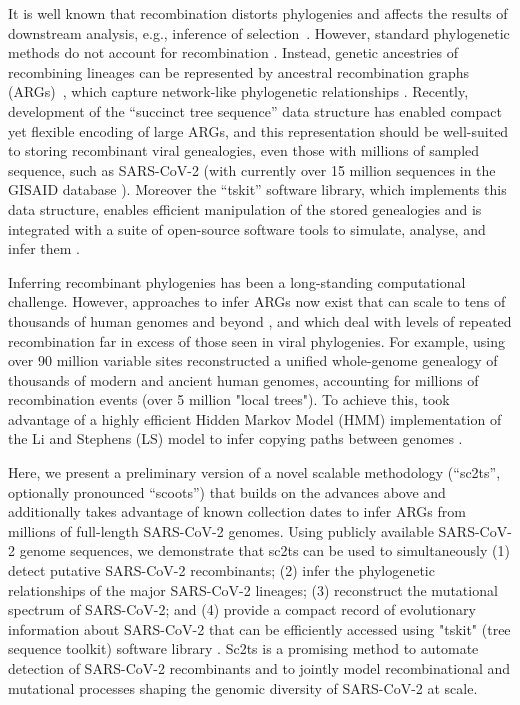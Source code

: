 \documentclass{article}
\begin{document}
It is well known that recombination distorts phylogenies \citep{Schierup2000-fg}
and affects the results of downstream analysis, e.g., inference of
selection~\citep{Anisimova2003-vr}. However, standard phylogenetic methods do
not account for recombination
\citep[e.g.][]{Ronquist2012-zw,Minh2020-lr,Guindon2003-zd}. Instead,
genetic ancestries of recombining lineages can be represented by ancestral
recombination graphs (ARGs)~\citep{Griffiths1981-lw,Hudson1983-if}, which
capture network-like phylogenetic relationships \citep{Gusfield2014-qw}. Recently,
development of the ``succinct tree sequence'' data
structure \citep{Kelleher2018-xc}  has enabled compact yet flexible
encoding of large ARGs, and this representation should be well-suited to storing
recombinant viral genealogies, even those with millions of sampled sequence,
such as SARS-CoV-2 (with currently over 15 million sequences in the GISAID database
\citep{Shu2017-hp}). Moreover the ``tskit'' software library, which implements this
data structure, enables efficient manipulation of the stored genealogies and is
integrated with a suite of open-source software tools to simulate, analyse, and
infer them \citep{Baumdicker2022-ep,Kelleher2018-xc,Kelleher2019-ba,Wohns2022-th}.


Inferring recombinant phylogenies has been a long-standing computational challenge.
However, approaches to infer ARGs now exist that can scale to tens of
thousands of human genomes and beyond
\citep{Speidel2019-yh,Kelleher2019-ba,Zhang2021-lf,Schaefer2021-yg}, and which
deal with levels of repeated recombination far in excess of those seen in viral
phylogenies. For example, using over 90 million variable sites
\citet{Wohns2022-th} reconstructed a unified whole-genome genealogy of thousands
of modern and ancient human genomes, accounting for millions of recombination
events (over 5 million "local trees"). To achieve this, \cite{Wohns2022-th}
took advantage of a highly efficient Hidden Markov Model (HMM) implementation
of the Li and Stephens (LS) model \citep{Li2003-ib} to infer copying paths between
genomes \citep{Kelleher2019-ba}.


Here, we present a preliminary version of a novel scalable methodology
(``sc2ts'', optionally pronounced ``scoots'') that builds on the advances above
and additionally takes advantage of known collection dates to infer ARGs from millions
of full-length SARS-CoV-2 genomes. Using publicly available SARS-CoV-2 genome sequences,
we demonstrate that sc2ts can be used to simultaneously (1) detect putative SARS-CoV-2
recombinants; (2) infer the phylogenetic relationships of the major SARS-CoV-2 lineages;
(3) reconstruct the mutational spectrum of SARS-CoV-2; and (4) provide a compact record
of evolutionary information about SARS-CoV-2 that can be efficiently accessed using
"tskit" (tree sequence toolkit) software library \citep{Kelleher2018-xc}.
Sc2ts is a promising method to automate detection of SARS-CoV-2 recombinants
and to jointly model recombinational and mutational processes shaping the genomic
diversity of SARS-CoV-2 at scale.
\end{document}

